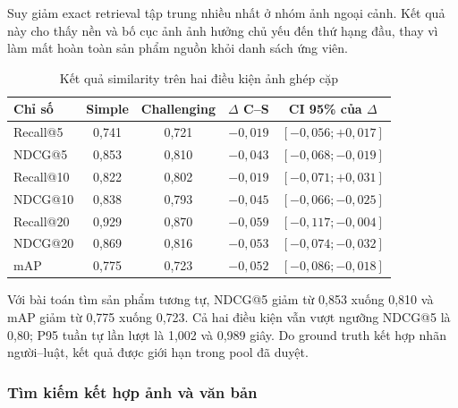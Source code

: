 Suy giảm exact retrieval tập trung nhiều nhất ở nhóm ảnh ngoại cảnh. Kết quả này cho thấy nền và bố cục ảnh ảnh hưởng chủ yếu đến thứ hạng đầu, thay vì làm mất hoàn toàn sản phẩm nguồn khỏi danh sách ứng viên.
\begin{table}[H]
\centering
\caption{Kết quả similarity trên hai điều kiện ảnh ghép cặp}
\label{tab:image-paired-similarity-results}
\small
\begin{tabularx}{\linewidth}{|X|c|c|c|c|}
\hline
\textbf{Chỉ số} & \textbf{Simple} & \textbf{Challenging} & \textbf{$\Delta$ C--S} & \makecell{\textbf{CI 95\%}\\\textbf{của $\Delta$}} \\ \hline
Recall@5  & 0,741 & 0,721 & $-0{,}019$ & $[-0{,}056; +0{,}017]$ \\ \hline
NDCG@5   & 0,853 & 0,810 & $-0{,}043$ & $[-0{,}068; -0{,}019]$ \\ \hline
Recall@10 & 0,822 & 0,802 & $-0{,}019$ & $[-0{,}071; +0{,}031]$ \\ \hline
NDCG@10  & 0,838 & 0,793 & $-0{,}045$ & $[-0{,}066; -0{,}025]$ \\ \hline
Recall@20 & 0,929 & 0,870 & $-0{,}059$ & $[-0{,}117; -0{,}004]$ \\ \hline
NDCG@20  & 0,869 & 0,816 & $-0{,}053$ & $[-0{,}074; -0{,}032]$ \\ \hline
mAP       & 0,775 & 0,723 & $-0{,}052$ & $[-0{,}086; -0{,}018]$ \\ \hline
\end{tabularx}
\end{table}

Với bài toán tìm sản phẩm tương tự, NDCG@5 giảm từ 0,853 xuống 0,810 và mAP giảm từ 0,775 xuống 0,723. Cả hai điều kiện vẫn vượt ngưỡng NDCG@5 là 0,80; P95 tuần tự lần lượt là 1,002 và 0,989 giây. Do ground truth kết hợp nhãn người--luật, kết quả được giới hạn trong pool đã duyệt.

\subsubsection{Tìm kiếm kết hợp ảnh và văn bản}

